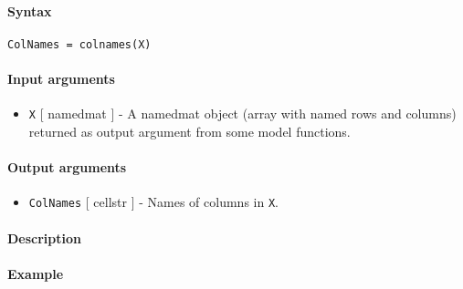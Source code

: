 


	\paragraph{Syntax}

\begin{verbatim}
ColNames = colnames(X)
\end{verbatim}

\paragraph{Input arguments}

\begin{itemize}
\itemsep1pt\parskip0pt
\item
  \texttt{X} {[} namedmat {]} - A namedmat object (array with named rows
  and columns) returned as output argument from some model functions.
\end{itemize}

\paragraph{Output arguments}

\begin{itemize}
\itemsep1pt\parskip0pt
\item
  \texttt{ColNames} {[} cellstr {]} - Names of columns in \texttt{X}.
\end{itemize}

\paragraph{Description}

\paragraph{Example}


